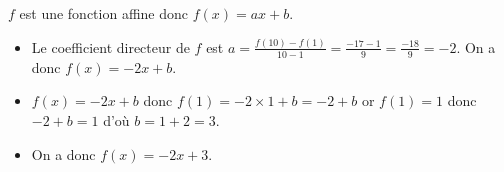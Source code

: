 \setcounter{exm}{1}

\begin{exm}
$f$ est une fonction affine donc $f(x)=ax+b$.
    \begin{itemize}
    \item Le coefficient directeur de $f$ est $a=\frac{f(10)-f(1)}{10-1}=\frac{-17-1}{9}=\frac{-18}{9}=-2$. 
    On a donc $f(x)=-2x+b$.
    \item $f(x)=-2x+b$ donc $f(1)=-2\times1+b=-2+b$ or $f(1)=1$ donc $-2+b=1$ d'où $b=1+2=3$.
    \item On a donc $f(x)=-2x+3$.
    \end{itemize}
\end{exm}
